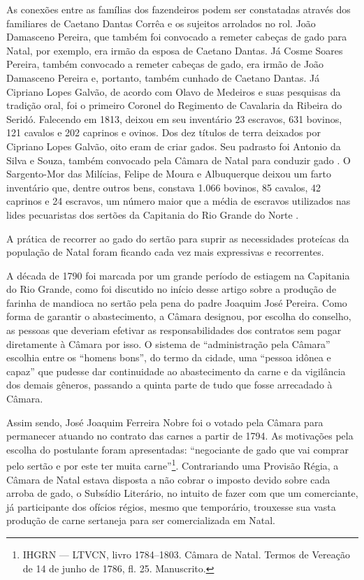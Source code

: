 \begin{refsection}
As conexões entre as famílias dos fazendeiros podem ser constatadas através dos familiares de Caetano Dantas Corrêa e os sujeitos arrolados no rol. João Damasceno Pereira, que também foi convocado a remeter cabeças de gado para Natal, por exemplo, era irmão da esposa de Caetano Dantas. Já Cosme Soares Pereira, também convocado a remeter cabeças de gado, era irmão de João Damasceno Pereira e, portanto, também cunhado de Caetano Dantas. Já Cipriano Lopes Galvão, de acordo com Olavo de Medeiros e suas pesquisas da tradição oral, foi o primeiro Coronel do Regimento de Cavalaria da Ribeira do Seridó. Falecendo em 1813, deixou em seu inventário 23 escravos, 631 bovinos, 121 cavalos e 202 caprinos e ovinos. Dos dez títulos de terra deixados por Cipriano Lopes Galvão, oito eram de criar gados. Seu padrasto foi Antonio da Silva e Souza, também convocado pela Câmara de Natal para conduzir gado \cite{MedeirosFilho1983velhos}. O Sargento-Mor das Milícias, Felipe de Moura e Albuquerque deixou um farto inventário que, dentre outros bens, constava 1.066 bovinos, 85 cavalos, 42 caprinos e 24 escravos, um número maior que a média de escravos utilizados nas lides pecuaristas dos sertões da Capitania do Rio Grande do Norte \cite{MedeirosFilho1981velhas}.

A prática de recorrer ao gado do sertão para suprir as necessidades proteícas da população de Natal foram ficando cada vez mais expressivas e recorrentes.

A década de 1790 foi marcada por um grande período de estiagem na Capitania do Rio Grande, como foi discutido no início desse artigo sobre a produção de farinha de mandioca no sertão pela pena do padre Joaquim José Pereira. Como forma de garantir o abastecimento, a Câmara designou, por escolha do conselho, as pessoas que deveriam efetivar as responsabilidades dos contratos sem pagar diretamente à Câmara por isso. O sistema de ``administração pela Câmara'' escolhia entre os ``homens bons'', do termo da cidade, uma ``pessoa idônea e capaz'' que pudesse dar continuidade ao abastecimento da carne e da vigilância dos demais gêneros, passando a quinta parte de tudo que fosse arrecadado à Câmara.

Assim sendo, José Joaquim Ferreira Nobre foi o votado pela Câmara para permanecer atuando no contrato das carnes a partir de 1794. As motivações pela escolha do postulante foram apresentadas: “negociante de gado que vai comprar pelo sertão e por este ter muita carne”\footnote{IHGRN --- LTVCN, livro 1784--1803. Câmara de Natal. Termos de Vereação de 14 de junho de 1786, fl. 25. Manuscrito.}. Contrariando uma Provisão Régia, a Câmara de Natal estava disposta a não cobrar o imposto devido sobre cada arroba de gado, o Subsídio Literário, no intuito de fazer com que um comerciante, já participante dos ofícios régios, mesmo que temporário, trouxesse sua vasta produção de carne sertaneja para ser comercializada em Natal.


\end{refsection}

